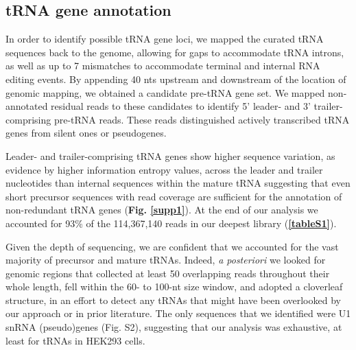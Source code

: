 \documentclass[12pt]{rockefeller}
\begin{document}
\subsection{tRNA gene annotation}
In order to identify possible tRNA gene loci, we mapped the curated tRNA sequences back to the genome, allowing for gaps to accommodate tRNA introns, as well as up to 7 mismatches to accommodate terminal and internal RNA editing events. By appending 40 nts upstream and downstream of the location of genomic mapping, we obtained a candidate pre-tRNA gene set. We mapped non-annotated residual reads to these candidates to identify 5’ leader- and 3’ trailer-comprising pre-tRNA reads. These reads distinguished actively transcribed tRNA genes from silent ones or pseudogenes.

Leader- and trailer-comprising tRNA genes show higher sequence variation, as evidence by higher information entropy values, across the leader and trailer nucleotides than internal sequences within the mature tRNA suggesting that even short precursor sequences with read coverage are sufficient for the annotation of non-redundant tRNA genes (\textbf{Fig. \ref{supp1}}). At the end of our analysis we accounted for 93\% of the 114,367,140 reads in our deepest library (\textbf{\ref{tableS1}}).

Given the depth of sequencing, we are confident that we accounted for the vast majority of precursor and mature tRNAs. Indeed, \textit{a posteriori} we looked for genomic regions that collected at least 50 overlapping reads throughout their whole length, fell within the 60- to 100-nt size window, and adopted a cloverleaf structure, in an effort to detect any tRNAs that might have been overlooked by our approach or in prior literature. The only sequences that we identified were U1 snRNA (pseudo)genes (Fig. S2), suggesting that our analysis was exhaustive, at least for tRNAs in HEK293 cells. 
\end{document}
